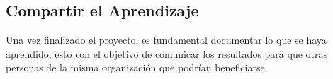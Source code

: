 \subsection{Compartir el Aprendizaje}

Una vez finalizado el proyecto, es fundamental documentar lo que se haya
aprendido, esto con el objetivo de comunicar los resultados para que otras
personas de la misma organización que podrían beneficiarse.


\nocite{*} %

\clearpage




